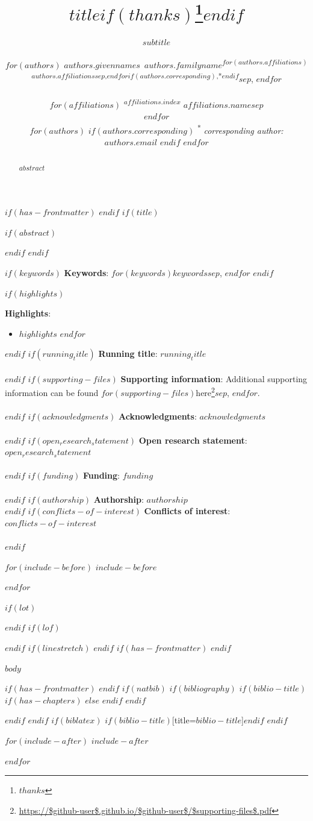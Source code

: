 \documentclass[11pt]{article}
\title{$title$$if(thanks)$\thanks{$thanks$}$endif$}
\subtitle{$subtitle$}
\author{
    $for(authors)$
        $authors.givennames$~$authors.familyname$\textsuperscript{$for(authors.affiliations)$$authors.affiliations$$sep$,$endfor$$if(authors.corresponding)$,*$endif$}$sep$,
    $endfor$
    \\\\
    $for(affiliations)$
        \textsuperscript{$affiliations.index$} \textit{$affiliations.name$}$sep$\\
    $endfor$
    \\
    $for(authors)$
      $if(authors.corresponding)$
        \textsuperscript{*} \textit{corresponding author: $authors.email$}
      $endif$
    $endfor$
}
\DeclareRobustCommand{\href}[2]{#2\footnote{\url{#1}}}
\begin{document}
$if(has-frontmatter)$
\frontmatter
$endif$
$if(title)$
\maketitle
$if(abstract)$
\begin{abstract}
$abstract$
\end{abstract}
$endif$
$endif$

$if(keywords)$
\hspace{1cm}\small{{\bf Keywords}: $for(keywords)$$keywords$$sep$, $endfor$}
$endif$

$if(highlights)$
\small{{\bf Highlights}:\vspace{-1.5em}
\begin{itemize}
  $for(highlights)$
    \item $highlights$
  $endfor$
\end{itemize}}
$endif$
$if(running_title)$
\small{{\bf Running title}: $running_title$}\\\\
$endif$
$if(supporting-files)$
\small{{\bf Supporting information}: Additional supporting information can be found $for(supporting-files)$\href{https://$github-user$.github.io/$github-user$/$supporting-files$.pdf}{here}$sep$, $endfor$.}\\\\
$endif$
$if(acknowledgments)$
\small{{\bf Acknowledgments}: $acknowledgments$}\\\\
$endif$
$if(open_research_statement)$
\small{{\bf Open research statement}: $open_research_statement$}\\\\
$endif$
$if(funding)$
\small{{\bf Funding}: $funding$}\\\\
$endif$
$if(authorship)$
\small{{\bf Authorship}: $authorship$}\\
$endif$
$if(conflicts-of-interest)$
\small{{\bf Conflicts of interest}: $conflicts-of-interest$}\\\\
$endif$

$for(include-before)$
$include-before$

$endfor$

$if(lot)$
\listoftables
$endif$
$if(lof)$
\listoffigures
$endif$
$if(linestretch)$
$endif$
$if(has-frontmatter)$
\mainmatter
$endif$

\linenumbers

$body$

$if(has-frontmatter)$
\backmatter
$endif$
$if(natbib)$
$if(bibliography)$
$if(biblio-title)$
$if(has-chapters)$
\renewcommand\bibname{$biblio-title$}
$else$
\renewcommand\refname{$biblio-title$}
$endif$
$endif$


$endif$
$endif$
$if(biblatex)$
\printbibliography$if(biblio-title)$[title=$biblio-title$]$endif$
$endif$

$for(include-after)$
$include-after$

$endfor$
\end{document}
